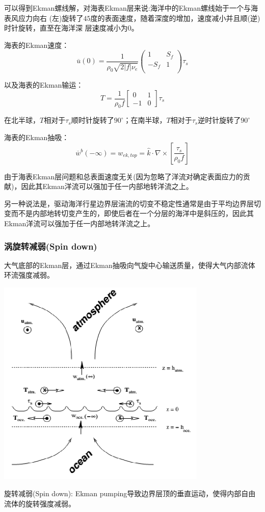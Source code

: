 \documentclass{article}
\begin{document}
可以得到Ekman螺线解，对海表Ekman层来说:海洋中的Ekman螺线始于一个与海表风应力向右
(左)旋转了$45$度的表面速度，随着深度的增加，速度减小并且顺(逆)时针旋转，直至在海洋深
层速度减小为$0$。

海表的Ekman速度：
$$\overline{u}(0)=\frac{1}{{{\rho }_{0}}\sqrt{2\left| f \right|{{\nu }_{e}}}}\left( \begin{matrix}
   1 & {{S}_{f}}  \\
   -{{S}_{f}} & 1  \\
\end{matrix} \right){{\tau }_{s}}$$

以及海表的Ekman输运：
$$T=\frac{1}{\rho_0f}\begin{bmatrix}
    0& 1\\
    -1& 0
\end{bmatrix}\tau_s$$

在北半球，$T$相对于$\tau_s$顺时针旋转了$90^{\circ}$；在南半球，$T$相对于$\tau_s$逆时针旋转了$90^{\circ}$

海表的Ekman抽吸：
$${{\overline{w}}^{b}}(-\infty )={{w}_{ek,top}}=\hat{k}\cdot \nabla \times \left[ \frac{{{\tau }_{s}}}{{{\rho }_{0}}f} \right]$$

由于海表Ekman层问题和总表面速度无关(因为忽略了洋流对确定表面应力的贡献)，因此其Ekman洋流可以强加于任一内部地转洋流之上。

另一种说法是，驱动海洋行星边界层湍流的切变不稳定性通常是由于平均边界层切变而不是内部地转切变产生的，即使后者在一个分层的海洋中是斜压的，因此其Ekman洋流可以强加于任一内部地转洋流之上。

\subsubsection{涡旋转减弱(Spin down)}
大气底部的Ekman层，通过Ekman抽吸向气旋中心输送质量，使得大气内部流体环流强度减弱。
\begin{center}
    \includegraphics[width=10cm]{Fig5_2.png}
\end{center}
旋转减弱(Spin down): Ekman pumping导致边界层顶的垂直运动，使得内部自由流体的旋转强度减弱。
\end{document}
